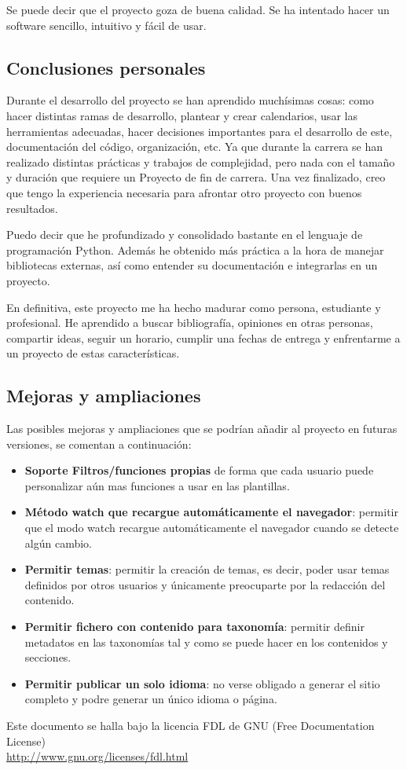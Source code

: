 \documentclass[a4paper,12pt]{article}
\begin{document}
Se puede decir que el proyecto goza de buena calidad. Se ha intentado hacer un software sencillo,
intuitivo y fácil de usar.

\subsection{Conclusiones personales}

Durante el desarrollo del proyecto se han aprendido muchísimas cosas: como hacer distintas ramas de
desarrollo, plantear y crear calendarios, usar las herramientas adecuadas, hacer decisiones importantes
para el desarrollo de este, documentación del código, organización, etc. Ya que durante la carrera se
han realizado distintas prácticas y trabajos de complejidad, pero nada con el tamaño y duración que
requiere un Proyecto de fin de carrera. Una vez finalizado, creo que tengo la experiencia necesaria
para afrontar otro proyecto con buenos resultados.

Puedo decir que he profundizado y consolidado bastante en el lenguaje de programación Python.
Además he obtenido más práctica a la hora de manejar bibliotecas
externas, así como entender su documentación e integrarlas en un proyecto.

En definitiva, este proyecto me ha hecho madurar como persona, estudiante y profesional. He aprendido a buscar
bibliografía, opiniones en otras personas, compartir ideas, seguir un horario, cumplir una fechas de
entrega y enfrentarme a un proyecto de estas características.

\subsection{Mejoras y ampliaciones}

Las posibles mejoras y ampliaciones que se podrían añadir al proyecto en futuras versiones, se comentan
a continuación:

\begin{itemize}
    \item \textbf{Soporte Filtros/funciones propias} de forma que cada usuario puede personalizar aún mas
    funciones a usar en las plantillas.
    \item \textbf{Método watch que recargue automáticamente el navegador}: permitir que el modo watch recargue
    automáticamente el navegador cuando se detecte algún cambio.
    \item \textbf{Permitir temas}: permitir la creación de temas, es decir, poder usar temas definidos
    por otros usuarios y únicamente preocuparte por la redacción del contenido.
    \item \textbf{Permitir fichero con contenido para taxonomía}: permitir definir metadatos en las taxonomías
    tal y como se puede hacer en los contenidos y secciones.
    \item \textbf{Permitir publicar un solo idioma}: no verse obligado a generar el sitio completo y podre generar
    un único idioma o página.
\end{itemize}




\vspace{0.75cm}

\begin{center}
{\footnotesize Este documento se halla bajo la licencia FDL de GNU (Free Documentation
  License)\\ \url{http://www.gnu.org/licenses/fdl.html} }
\end{center}
\end{document}
